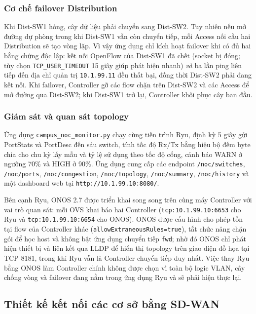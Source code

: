 \subsubsection{Cơ chế failover Distribution}

Khi Dist-SW1 hỏng, cây dữ liệu phải chuyển sang Dist-SW2. Tuy nhiên nếu mở đường dự phòng trong khi Dist-SW1 vẫn còn chuyển tiếp, mỗi Access nối cầu hai Distribution sẽ tạo vòng lặp. Vì vậy ứng dụng chỉ kích hoạt failover khi có đủ hai bằng chứng độc lập: kết nối OpenFlow của Dist-SW1 đã chết (socket bị đóng; tùy chọn \texttt{TCP\_USER\_TIMEOUT} 15 giây giúp phát hiện nhanh) \textit{và} ba lần ping liên tiếp đến địa chỉ quản trị \texttt{10.1.99.11} đều thất bại, đồng thời Dist-SW2 phải đang kết nối. Khi failover, Controller gỡ các flow chặn trên Dist-SW2 và các Access để mở đường qua Dist-SW2; khi Dist-SW1 trở lại, Controller khôi phục cây ban đầu.

\subsubsection{Giám sát và quan sát topology}

Ứng dụng \texttt{campus\_noc\_monitor.py} chạy cùng tiến trình Ryu, định kỳ 5 giây gửi PortStats và PortDesc đến sáu switch, tính tốc độ Rx/Tx bằng hiệu bộ đếm byte chia cho chu kỳ lấy mẫu và tỷ lệ sử dụng theo tốc độ cổng, cảnh báo WARN ở ngưỡng 70\% và HIGH ở 90\%. Ứng dụng cung cấp các endpoint \texttt{/noc/switches}, \texttt{/noc/ports}, \texttt{/noc/congestion}, \texttt{/noc/topology}, \texttt{/noc/summary}, \texttt{/noc/history} và một dashboard web tại \texttt{http://10.1.99.10:8080/}.

Bên cạnh Ryu, ONOS 2.7 được triển khai song song trên cùng máy Controller với vai trò quan sát: mỗi OVS khai báo hai Controller (\texttt{tcp:10.1.99.10:6653} cho Ryu và \texttt{tcp:10.1.99.10:6654} cho ONOS). ONOS được cấu hình cho phép tồn tại flow của Controller khác (\texttt{allowExtraneousRules=true}), tắt chức năng chặn gói để học host và không bật ứng dụng chuyển tiếp \texttt{fwd}; nhờ đó ONOS chỉ phát hiện thiết bị và liên kết qua LLDP để hiển thị topology trên giao diện đồ họa tại TCP 8181, trong khi Ryu vẫn là Controller chuyển tiếp duy nhất. Việc thay Ryu bằng ONOS làm Controller chính không được chọn vì toàn bộ logic VLAN, cây chống vòng và failover đang nằm trong ứng dụng Ryu và sẽ phải hiện thực lại.

\subsection{Thiết kế kết nối các cơ sở bằng SD-WAN}

